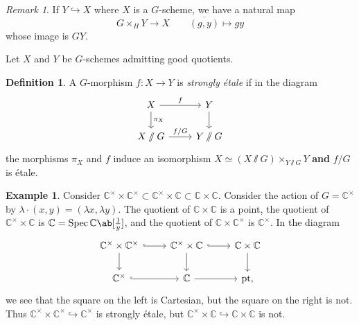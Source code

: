 \documentclass{amsart}
\theoremstyle{definition}
\newtheorem{defn}[thm]{Definition}
\newtheorem{exm}[thm]{Example}
\theoremstyle{remark}
\newtheorem{rmk}[thm]{Remark}
\theoremstyle{plain}
\theoremstyle{definition}
\theoremstyle{remark}
\newcommand{\C}{\mathbb{C}}
\newcommand{\ol}[1]{\overline{#1}}
\newcommand{\1}{\mathbf{1}}
\newcommand{\2}{\mathbf{2}}
\newcommand{\3}{\mathbf{3}}
\DeclareMathOperator{\Spec}{Spec}
\begin{document}
\begin{rmk}
    If \(Y \hookrightarrow X\) where \(X\) is a \(G\)-scheme, we have a natural map
    \[ G \times_H Y \to X \qquad \ol{(g, y)} \mapsto gy \]
    whose image is \(GY\).
\end{rmk}

Let \(X\) and \(Y\) be \(G\)-schemes admitting good quotients.
\begin{defn}
    A \(G\)-morphism \(f \colon X \to Y\) is \textit{strongly \'etale} if in the diagram
    \begin{equation*}
    \begin{tikzcd}
        X \ar{r}{f} \ar{d}{\pi_X} & Y \ar{d} \\
        X \sslash G \ar{r}{f/G} & Y \sslash G
    \end{tikzcd}
    \end{equation*}
    the morphisms \(\pi_X\) and \(f\) induce an isomorphism \(X \simeq (X \sslash G) \times_{Y \sslash G} Y\) \textbf{and} \(f/G\) is \'etale.
\end{defn}

\begin{exm}
    Consider \(\C^{\times} \times \C^{\times} \subset \C^{\times} \times \C \subset \C \times \C\). Consider the action of \(G = \C^{\times}\) by \(\lambda \cdot (x, y) = (\lambda x, \lambda y)\). The quotient of \(\C \times \C\) is a point, the quotient of \(\C^{\times} \times \C\) is \(\C = \Spec \C \ab[\frac{1}{y}]\), and the quotient of \(\C \times \C^{\times}\) is \(\C^{\times}\). In the diagram
    \begin{equation*}
    \begin{tikzcd}
        \C^{\times} \times \C^{\times} \ar[hookrightarrow]{r} \ar{d} & \C^{\times} \times \C \ar[hookrightarrow]{r} \ar{d} & \C \times \C \ar{d} \\
        \C^{\times} \ar[hookrightarrow]{r} & \C \ar{r} & \text{pt},
    \end{tikzcd}
    \end{equation*}
    we see that the square on the left is Cartesian, but the square on the right is not. Thus \(\C^{\times} \times \C^{\times} \hookrightarrow \C^{\times}\) is strongly \'etale, but \(\C^{\times} \times \C \hookrightarrow \C \times \C\) is not.
\end{exm}
\end{document}
